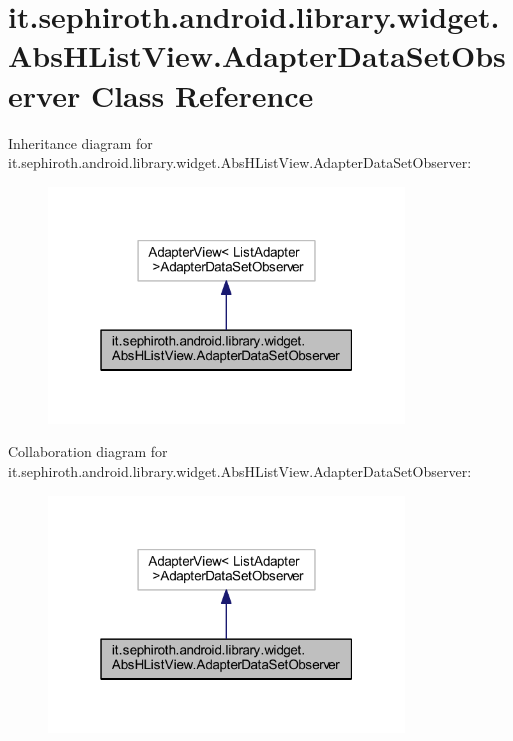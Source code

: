 \hypertarget{classit_1_1sephiroth_1_1android_1_1library_1_1widget_1_1_abs_h_list_view_1_1_adapter_data_set_observer}{}\section{it.\+sephiroth.\+android.\+library.\+widget.\+Abs\+H\+List\+View.\+Adapter\+Data\+Set\+Observer Class Reference}
\label{classit_1_1sephiroth_1_1android_1_1library_1_1widget_1_1_abs_h_list_view_1_1_adapter_data_set_observer}


Inheritance diagram for it.\+sephiroth.\+android.\+library.\+widget.\+Abs\+H\+List\+View.\+Adapter\+Data\+Set\+Observer\+:
\nopagebreak
\begin{figure}[H]
\begin{center}
\leavevmode
\includegraphics[width=268pt]{classit_1_1sephiroth_1_1android_1_1library_1_1widget_1_1_abs_h_list_view_1_1_adapter_data_set_observer__inherit__graph}
\end{center}
\end{figure}


Collaboration diagram for it.\+sephiroth.\+android.\+library.\+widget.\+Abs\+H\+List\+View.\+Adapter\+Data\+Set\+Observer\+:
\nopagebreak
\begin{figure}[H]
\begin{center}
\leavevmode
\includegraphics[width=268pt]{classit_1_1sephiroth_1_1android_1_1library_1_1widget_1_1_abs_h_list_view_1_1_adapter_data_set_observer__coll__graph}
\end{center}
\end{figure}
